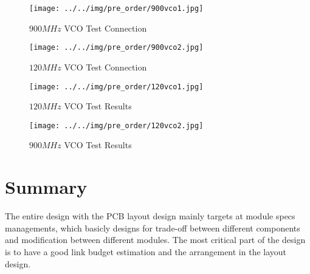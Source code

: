 \documentclass[]{article}
\begin{document}
    \begin{figure}[t!]
        \begin{center}
            \vspace{-0.3in}
            \texttt{[image: ../../img/pre\_order/900vco1.jpg]}
            \label{fig:mixer2}
            \caption{$900MHz$ VCO Test Connection}
        \end{center}
    \end{figure}

    \begin{figure}[b!]
        \begin{center}
            \vspace{-0in}
            \texttt{[image: ../../img/pre\_order/900vco2.jpg]}
            \label{fig:mixer2}
            \caption{$120MHz$ VCO Test Connection}
        \end{center}
    \end{figure}

    \begin{figure}[t!]
        \begin{center}
            \vspace{-0.3in}
            \texttt{[image: ../../img/pre\_order/120vco1.jpg]}
            \caption{$120MHz$ VCO Test Results}
            \label{fig:mixer2}
        \end{center}
    \end{figure}

    \begin{figure}[b!]
        \begin{center}
            \vspace{-0in}
            \texttt{[image: ../../img/pre\_order/120vco2.jpg]}
            \label{fig:mixer2}
            \caption{$900MHz$ VCO Test Results}
        \end{center}
    \end{figure}

\section{Summary}
    The entire design with the PCB layout design mainly targets at module specs
    managements, which basicly designs for trade-off between different
    components and modification between different modules. The most critical
    part of the design is to have a good link budget estimation and the
    arrangement in the layout design. 
\end{document}
